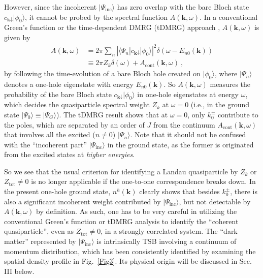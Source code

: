 \documentclass[aps,prb,twocolumn,notitlepage,superscriptaddress,showpacs]{revtex4-1}
\begin{document}
However, since the incoherent $|\Psi_{\mathrm {inc}}\rangle $ has zero overlap with the bare Bloch state $c_{{\textbf{k}}\downarrow}|\phi_0 \rangle$, it cannot be probed by the spectral function $A({ \textbf{k}},\omega)$.  In a conventional Green's function or the  time-dependent DMRG (tDMRG) approach \cite{Andersonbook,WSK2015}, $A({ \textbf{k}},\omega)$ is given by
\begin{align}\label{A}
A({\textbf{k}},\omega)&=2\pi \sum_{n }\left |\langle \Psi_n |c_{{\textbf{k}}\downarrow}|\phi_0 \rangle \right |^2\delta(\omega-E_{n0}(\textbf{k})) \nonumber \\
&\equiv 2\pi Z_k \delta(\omega)+ A_{\mathrm{cont}}({\textbf{k}},\omega)~,
\end{align}
by following the time-evolution of a bare Bloch hole created on $|\phi_0\rangle $, where $|\Psi_n \rangle$ denotes a one-hole eigenstate with energy $E_{n0}(\textbf{k})$. So $A({\textbf{k}},\omega)$ measures the probability of the bare Bloch state $c_{{ \textbf{k}}\downarrow}|\phi_0 \rangle$ in one-hole eigenstates at energy $\omega$, which decides the quasiparticle spectral weight $Z_k$ at $\omega=0$ (i.e., in the ground state $|\Psi_0 \rangle\equiv |\Psi_G \rangle$). The tDMRG result shows \cite{WSK2015} that at $\omega=0$, only $k^{\pm}_0$ contribute to the poles, which are separated by an order of $J$ from the continuum $A_{\mathrm{cont}}({\textbf{k}},\omega)$ that involves all the excited ($n\neq 0$) $|\Psi_n \rangle$. Note that it should not be confused with the ``incoherent part'' $|\Psi_{\mathrm {inc}}\rangle $ in the ground state, as the former is originated from the excited states at \emph{higher energies}.

So we see that the usual criterion for identifying a Landau quasiparticle by $Z_k$ or $Z_{\mathrm {tot}} \neq 0$ is no longer applicable if the one-to-one correspondence breaks down. In the present one-hole ground state, $n^h({\textbf{k}})$ clearly shows that besides $k^{\pm}_0$, there is also a significant incoherent weight contributed by $|\Psi_{\mathrm {inc}}\rangle $, but not detectable by $A({\textbf{k}},\omega)$ by definition. As such, one has to be very careful in utilizing the conventional Green's function or tDMRG analysis to identify the ``coherent quasiparticle'', even as $Z_{\mathrm {tot}} \neq 0$, in a strongly correlated system. The ``dark matter'' represented by $|\Psi_{\mathrm {inc}}\rangle $ is intrinsically TSB involving a continuum of momentum distribution, which has been consistently identified by examining the spatial density profile in Fig.~\ref{Fig3}. Its physical origin will be discussed in Sec. III below.
\end{document}
